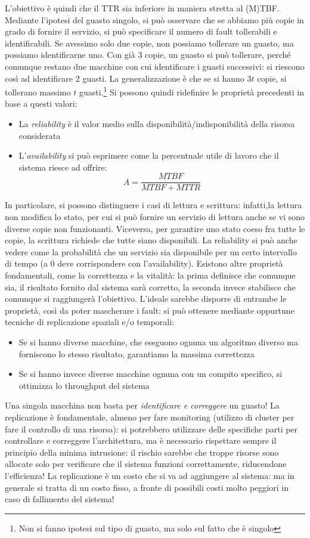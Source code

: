 L'obiettivo è quindi che il TTR sia inferiore in maniera stretta al (M)TBF.
Mediante l'ipotesi del guasto singolo, si può osservare che se abbiamo più
copie in grado di fornire il servizio, si
può specificare il numero di fault tollerabili e identificabili. Se avessimo
solo due copie, non possiamo tollerare un
guasto, ma possiamo identificarne uno. Con già 3 copie, un guasto si può
tollerare,
perché comunque restano due macchine con cui identificare i guasti successivi:
si riescono così ad identificare 2 guasti. La generalizzazione è che se si
hanno $3t$ copie, si tollerano massimo $t$ guasti.\footnote{Non si fanno ipotesi
sul tipo di guasto, ma solo sul fatto che è singolo} Si possono quindi
ridefinire le proprietà precedenti in base a questi valori:
\begin{itemize}
 \item La \textit{reliability} è il valor medio sulla
 disponibilità/indisponibilità della risorsa considerata
 \item L'\textit{availability} si può esprimere come la percentuale utile di
lavoro che il sistema riesce ad offrire:
 \begin{equation}
  A = \frac{MTBF}{MTBF + MTTR}
 \end{equation}
\end{itemize}
In particolare, si possono distinguere i casi di lettura e scrittura: infatti,la
lettura non modifica lo stato, per cui si può fornire un servizio di lettura
anche se vi sono diverse copie non funzionanti. Viceversa, per garantire uno
stato coeso fra tutte le copie, la scrittura richiede che tutte siano
disponibili.
La reliability si può anche vedere come la probabilità che un servizio sia
disponibile per un certo intervallo di tempo (a 0 deve corrispondere con
l'availability).
Esistono altre proprietà fondamentali, come la correttezza e la vitalità: la
prima definisce che comunque sia, il risultato fornito dal sistema sarà
corretto, la seconda invece stabilisce che comunque si raggiungerà l'obiettivo.
L'ideale sarebbe disporre di entrambe le proprietà, così da poter mascherare i
fault: si può ottenere mediante oppurtune tecniche di replicazione spaziali e/o
temporali:
\begin{itemize}
 \item Se si hanno diverse macchine, che eseguono ognuna un algoritmo diverso ma
 forniscono lo stesso risultato, garantiamo la massima correttezza
 \item Se si hanno invece diverse macchine ognuna con un compito specifico, si
 ottimizza lo throughput del sistema
\end{itemize}
Una singola macchina non basta per \textit{identificare e correggere} un guasto!
La replicazione è fondamentale, almeno per fare monitoring (utilizzo di cluster
per fare il controllo di una risorsa): si potrebbero utilizzare delle specifiche
parti per controllare e correggere l'architettura, ma è necessario rispettare
sempre il principio della minima intrusione: il rischio sarebbe che troppe
risorse sono allocate solo per verificare che il sistema funzioni correttamente,
riducendone l'efficienza! La replicazione è un costo che si va ad aggiungere al
sistema: ma in generale si tratta di un costo fisso, a fronte di possibili costi
molto peggiori in caso di fallimento del sistema!
